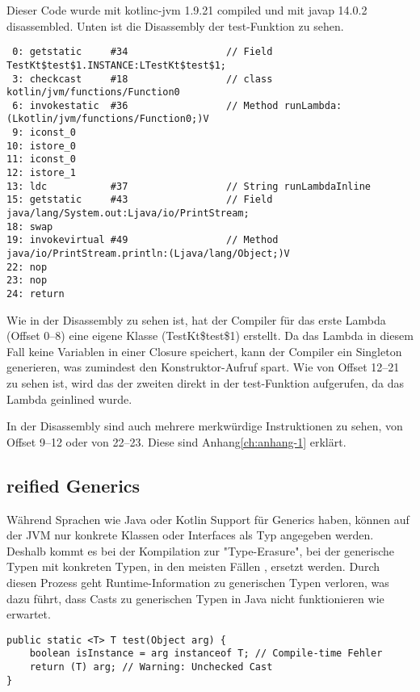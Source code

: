 Dieser Code wurde mit kotlinc-jvm 1.9.21 compiled und mit javap 14.0.2 disassembled.
Unten ist die Disassembly der test-Funktion zu sehen.

\begin{verbatim}
 0: getstatic     #34                 // Field TestKt$test$1.INSTANCE:LTestKt$test$1;
 3: checkcast     #18                 // class kotlin/jvm/functions/Function0
 6: invokestatic  #36                 // Method runLambda:(Lkotlin/jvm/functions/Function0;)V
 9: iconst_0
10: istore_0
11: iconst_0
12: istore_1
13: ldc           #37                 // String runLambdaInline
15: getstatic     #43                 // Field java/lang/System.out:Ljava/io/PrintStream;
18: swap
19: invokevirtual #49                 // Method java/io/PrintStream.println:(Ljava/lang/Object;)V
22: nop
23: nop
24: return
\end{verbatim}

Wie in der Disassembly zu sehen ist, hat der Compiler für das erste Lambda (Offset 0--8) eine eigene Klasse
(TestKt\$test\$1) erstellt.
Da das Lambda in diesem Fall keine Variablen in einer Closure speichert, kann der Compiler ein Singleton generieren,
was zumindest den Konstruktor-Aufruf spart.
Wie von Offset 12--21 zu sehen ist, wird das  der zweiten direkt in der test-Funktion
aufgerufen, da das Lambda geinlined wurde.

\begin{infoBox}
In der Disassembly sind auch mehrere merkwürdige Instruktionen zu sehen, \zB von Offset 9--12 oder von 22--23.
Diese sind Anhang\ref{ch:anhang-1} erklärt.
\end{infoBox}

\subsection{reified Generics}

Während Sprachen wie Java oder Kotlin Support für Generics haben, können auf der JVM nur konkrete Klassen oder
Interfaces als Typ angegeben werden.
Deshalb kommt es bei der Kompilation zur "Type-Erasure", bei der generische Typen mit konkreten Typen, in den meisten
Fällen , ersetzt werden.
Durch diesen Prozess geht Runtime-Information zu generischen Typen verloren, was \zB dazu führt, dass Casts zu
generischen Typen in Java nicht funktionieren wie erwartet.\cite{jdocTypeErasure}

\begin{verbatim}
public static <T> T test(Object arg) {
    boolean isInstance = arg instanceof T; // Compile-time Fehler
    return (T) arg; // Warning: Unchecked Cast
}
\end{verbatim}

